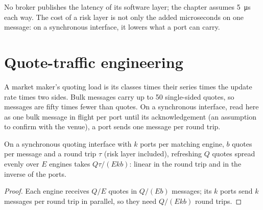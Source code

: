 No broker publishes the latency of its software layer; the chapter assumes \qty{5}{\micro\second} each way. The cost of a
risk layer is not only the added microseconds on one message: on a synchronous interface, it lowers what a port can carry.

\section{Quote-traffic engineering}

A market maker's quoting load is its classes times their series times the update rate times two sides. Bulk messages carry
up to 50 single-sided quotes, so messages are fifty times fewer than quotes. On a synchronous interface, read here as one
bulk message in flight per port until its acknowledgement (an assumption to confirm with the venue), a port sends one
message per round trip.

\label{lst:nw:equities-and-options-connectivity:ports}

\begin{proposition}\label{prop:nw:equities-and-options-connectivity:refresh}
On a synchronous quoting interface with $k$ ports per matching engine, $b$ quotes per message and a round trip $\tau$ (risk
layer included), refreshing $Q$ quotes spread evenly over $E$ engines takes $Q\tau/(Ekb)$: linear in the round trip and in
the inverse of the ports.
\end{proposition}

\begin{proof}
Each engine receives $Q/E$ quotes in $Q/(Eb)$ messages; its $k$ ports send $k$ messages per round trip in parallel, so they need
$Q/(Ekb)$ round trips.
\end{proof}

